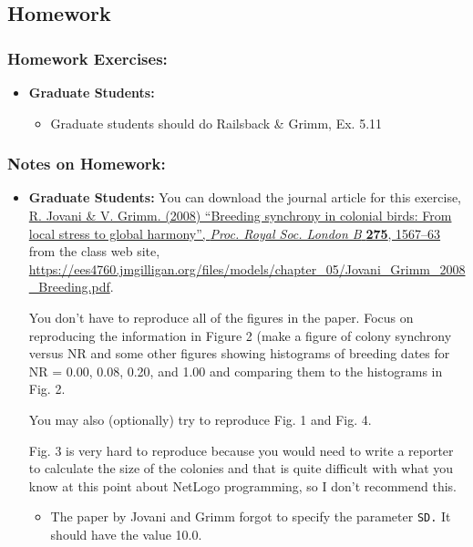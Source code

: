 \documentclass[
]{article}
\providecommand{\tightlist}{%
  \setlength{\itemsep}{0pt}\setlength{\parskip}{0pt}}
\begin{document}
\subsection{Homework}\label{homework-5}

\subsubsection{Homework Exercises:}\label{homework-exercises-5}

\begin{itemize}
\item
  \textbf{Graduate Students:}

  \begin{itemize}
  \tightlist
  \item
    Graduate students should do Railsback \& Grimm, Ex. 5.11
  \end{itemize}
\end{itemize}

\subsubsection{Notes on Homework:}\label{notes-on-homework-3}

\begin{itemize}
\item
  \textbf{Graduate Students:} You can download the journal article for
  this exercise,
  \href{/files/models/chapter_05/Jovani_Grimm_2008_Breeding.pdf}{R.
  Jovani \& V. Grimm. (2008) ``Breeding synchrony in colonial birds:
  From local stress to global harmony'', \emph{Proc. Royal Soc. London
  B} \textbf{275}, 1567--63} from the class web site,
  \url{https://ees4760.jmgilligan.org/files/models/chapter_05/Jovani_Grimm_2008_Breeding.pdf}.

  You don't have to reproduce all of the figures in the paper. Focus on
  reproducing the information in Figure 2 (make a figure of colony
  synchrony versus NR and some other figures showing histograms of
  breeding dates for NR = 0.00, 0.08, 0.20, and 1.00 and comparing them
  to the histograms in Fig. 2.

  You may also (optionally) try to reproduce Fig. 1 and Fig. 4.

  Fig. 3 is very hard to reproduce because you would need to write a
  reporter to calculate the size of the colonies and that is quite
  difficult with what you know at this point about NetLogo programming,
  so I don't recommend this.

  \begin{itemize}
  \tightlist
  \item
    The paper by Jovani and Grimm forgot to specify the parameter
    \texttt{SD.} It should have the value 10.0.
  \end{itemize}
\end{itemize}
\end{document}

